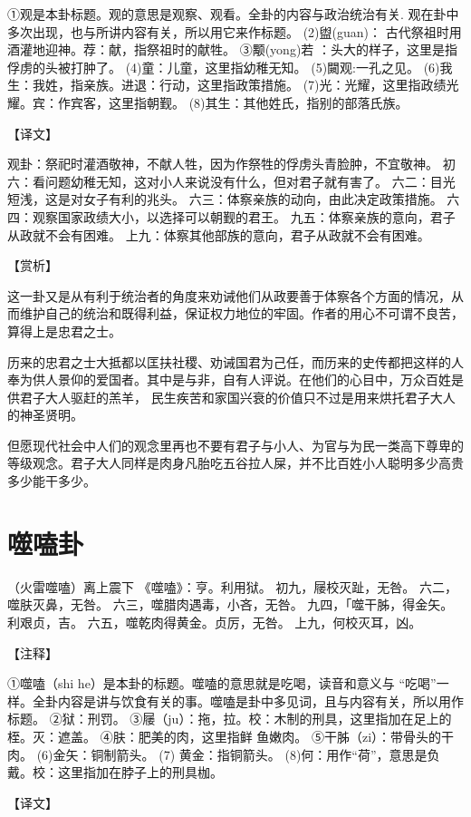 \documentclass[12pt,UTF8]{ctexbook}
\begin{document}
①观是本卦标题。观的意思是观察、观看。全卦的内容与政治统治有关. 观在卦中多次出现，也与所讲内容有关，所以用它来作标题。
(2)盥(guan)： 古代祭祖时用酒灌地迎神。荐：献，指祭祖时的献牲。
③颙(yong)若 ：头大的样子，这里是指俘虏的头被打肿了。
(4)童：儿童，这里指幼稚无知。
(5)闚观:一孔之见。
(6)我生：我姓，指亲族。进退：行动，这里指政策措施。
(7)光：光耀，这里指政绩光耀。宾：作宾客，这里指朝觐。
(8)其生：其他姓氏，指别的部落氏族。

【译文】

观卦：祭祀时灌酒敬神，不献人牲，因为作祭牲的俘虏头青脸肿，不宜敬神。
初六：看问题幼稚无知，这对小人来说没有什么，但对君子就有害了。
六二：目光短浅，这是对女子有利的兆头。
六三：体察亲族的动向，由此决定政策措施。
六四：观察国家政绩大小，以选择可以朝觐的君王。
九五：体察亲族的意向，君子从政就不会有困难。
上九：体察其他部族的意向，君子从政就不会有困难。

【赏析】

这一卦又是从有利于统治者的角度来劝诫他们从政要善于体察各个方面的情况，从而维护自己的统治和既得利益，保证权力地位的牢固。作者的用心不可谓不良苦，算得上是忠君之士。

历来的忠君之士大抵都以匡扶社稷、劝诫国君为己任，而历来的史传都把这样的人奉为供人景仰的爱国者。其中是与非，自有人评说。在他们的心目中，万众百姓是供君子大人驱赶的羔羊， 民生疾苦和家国兴衰的价值只不过是用来烘托君子大人的神圣贤明。

但愿现代社会中人们的观念里再也不要有君子与小人、为官与为民一类高下尊卑的等级观念。君子大人同样是肉身凡胎吃五谷拉人屎，并不比百姓小人聪明多少高贵多少能干多少。

\chapter{噬嗑卦}

（火雷噬嗑）离上震下
《噬嗑》：亨。利用狱。
初九，屦校灭趾，无咎。
六二，噬肤灭鼻，无咎。
六三，噬腊肉遇毒，小吝，无咎。
九四，「噬干胏，得金矢。利艰贞，吉。
六五，噬乾肉得黄金。贞厉，无咎。
上九，何校灭耳，凶。

【注释】

①噬嗑（shi he）是本卦的标题。噬嗑的意思就是吃喝，读音和意义与 “吃喝”一样。全卦内容是讲与饮食有关的事。噬嗑是卦中多见词，且与内容有关，所以用作标题。
②狱：刑罚。
③屦（ju）：拖，拉。校：木制的刑具，这里指加在足上的桎。灭：遮盖。
④肤：肥美的肉，这里指鲜 鱼嫩肉。
⑤干胏（zi）：带骨头的干肉。
(6)金矢：铜制箭头。
(7) 黄金：指铜箭头。
(8)何：用作“荷”，意思是负戴。校：这里指加在脖子上的刑具枷。

【译文】
\end{document}
